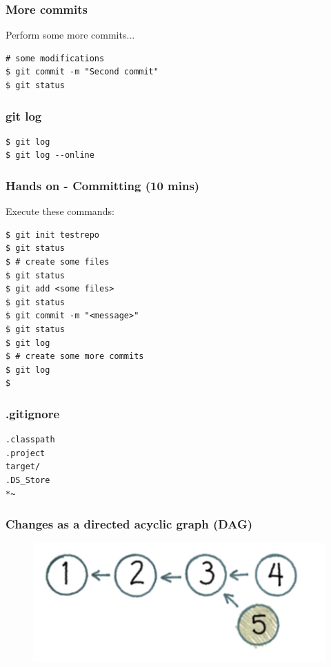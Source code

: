 \documentclass{beamer}
\begin{document}
\begin{frame}[fragile]
\frametitle{More commits}

Perform some more commits...

\begin{lstlisting}
# some modifications
$ git commit -m "Second commit"
$ git status
\end{lstlisting}
\end{frame}


\begin{frame}[fragile]
\frametitle{git log}

\begin{lstlisting}
$ git log
$ git log --online
\end{lstlisting}
\end{frame}

\begin{frame}[fragile]
\frametitle{Hands on - Committing (10 mins)}

Execute these commands:

\begin{lstlisting}
$ git init testrepo
$ git status
$ # create some files
$ git status
$ git add <some files>
$ git status
$ git commit -m "<message>"
$ git status
$ git log
$ # create some more commits
$ git log
$
\end{lstlisting}
\end{frame}


\begin{frame}[fragile]
\frametitle{.gitignore}

\begin{lstlisting}
.classpath
.project
target/
.DS_Store
*~
\end{lstlisting}

\end{frame}



\begin{frame}
\frametitle{Changes as a directed acyclic graph (DAG)}

\begin{figure}
\includegraphics[scale=0.3]{figures/f10.png}
\end{figure}

\end{frame}
\end{document}
